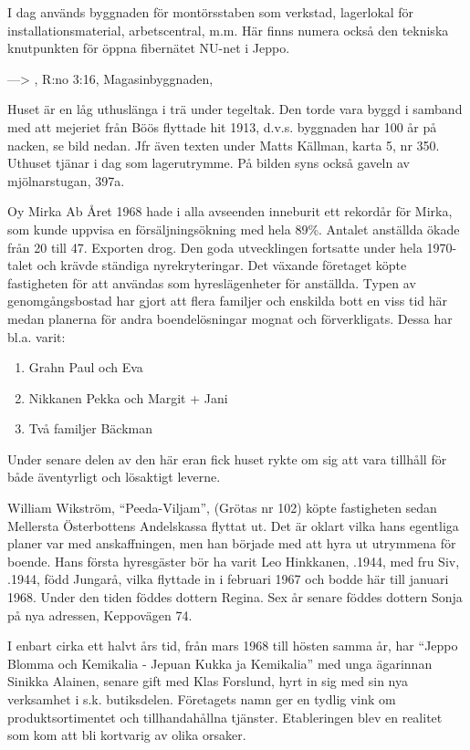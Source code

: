 I dag används byggnaden för montörsstaben som verkstad, lagerlokal för installationsmaterial, arbetscentral, m.m. Här finns numera också den tekniska knutpunkten för öppna fibernätet NU-net i Jeppo.


---> , R:no 3:16, 	Magasinbyggnaden, 

Huset är en låg uthuslänga i trä under tegeltak. Den torde vara byggd i samband med att mejeriet från Böös flyttade hit 1913, d.v.s. byggnaden har 100 år på nacken, se bild nedan. Jfr även texten under Matts Källman, karta 5, nr 350. Uthuset tjänar i dag som lagerutrymme. På bilden syns också gaveln av mjölnarstugan, 397a.



Oy Mirka Ab	Året 1968 hade i alla avseenden inneburit ett rekordår för Mirka, som kunde uppvisa en försäljningsökning med hela 89\%. Antalet anställda ökade från 20 till 47. Exporten drog. Den goda utvecklingen fortsatte under hela 1970-talet och krävde ständiga nyrekryteringar. Det växande företaget köpte fastigheten för att användas som hyreslägenheter för anställda. Typen av genomgångsbostad har gjort att flera familjer och enskilda bott en viss tid här medan planerna för andra boendelösningar mognat och förverkligats. Dessa har bl.a. varit:
\begin{enumerate}
  \item Grahn Paul och Eva
  \item Nikkanen Pekka och Margit + Jani
  \item Två familjer Bäckman
\end{enumerate}
Under senare delen av den här eran fick huset rykte om sig att vara tillhåll för både äventyrligt och lösaktigt leverne.


William Wikström, ``Peeda-Viljam'', (Grötas nr 102) köpte fastigheten sedan Mellersta Österbottens Andelskassa flyttat ut. Det är oklart vilka hans egentliga planer var med anskaffningen, men han började med att hyra ut utrymmena för boende. Hans första hyresgäster bör ha varit Leo Hinkkanen, .1944, med fru Siv, .1944, född Jungarå, vilka flyttade in i februari 1967 och bodde här till januari 1968. Under den tiden föddes dottern Regina. Sex år senare föddes dottern Sonja på nya adressen, Keppovägen 74.

I enbart cirka ett halvt års tid, från mars 1968 till hösten samma år, har ``Jeppo Blomma och Kemikalia - Jepuan Kukka ja Kemikalia'' med unga ägarinnan Sinikka Alainen, senare gift med Klas Forslund, hyrt in sig med sin nya verksamhet i s.k. butiksdelen. Företagets namn ger en tydlig vink om produktsortimentet och tillhandahållna tjänster. Etableringen blev en realitet som kom att bli kortvarig av olika orsaker.

